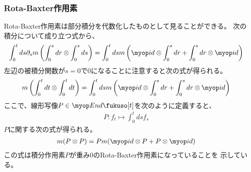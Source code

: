 {\subsubsection{Rota-Baxter作用素}\label{s3:Rota-Baxter作用素} %
	Rota-Baxter作用素は部分積分を代数化したものとして見ることができる。
	次の積分について成り立つ式から、
	\begin{equation*}\begin{split}
		\int_0^tds\partial_sm\left(\int_0^sdr\otimes\int_0^sds\right)
		= \int_0^tdsm\left(\id\otimes\int_0^sdr+\int_0^sdr\otimes\id\right)
	\end{split}\end{equation*}
	左辺の被積分関数が$s=0$で$0$になることに注意すると次の式が得られる。
	\begin{equation*}\begin{split}
		m\left(\int_0^tdt\otimes\int_0^tdt\right)
		= \int_0^tdsm\left(\id\otimes\int_0^sdr+\int_0^sdr\otimes\id\right)
	\end{split}\end{equation*}
	ここで、線形写像$P\in\End\fukuso[t]$を次のように定義すると、
	\begin{equation*}\begin{split}
		P: f_t\mapsto \int_0^tds f_s
	\end{split}\end{equation*}
	$P$に関する次の式が得られる。
	\begin{equation*}\begin{split}
		m(P\otimes P) = Pm(\id\otimes P + P\otimes\id)
	\end{split}\end{equation*}
	この式は積分作用素$P$が重み$0$のRota-Baxter作用素になっていることを
	示している\cite{GuoIntro}。
	\begin{todo}[ここまで]\label{todo:ここまで} %
	\end{todo} %

}
